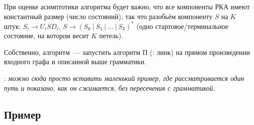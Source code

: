 При оценке асимптотики алгоритма будет важно, что все компоненты РКА имеют константный размер (число состояний), так что разобьём компоненту $S$ на $K$ штук: $S_i \to U_i S D_i$, $S \to (S_0~|~S_1~|~ \dots ~|~ S_k)^*$ (одно стартовое/терминальное состояние, на котором весит $K$ петель).

Собственно, алгоритм~--- запустить алгоритм П (\TODO: линк) на прямом произведении входного графа и описанной выше грамматики.


\TODO: \textit{можно сюда просто вставить маленький пример, где рассматривается один путь и показано, как он сжимается, без пересечения с грамматикой.}


\subsection{Пример}

